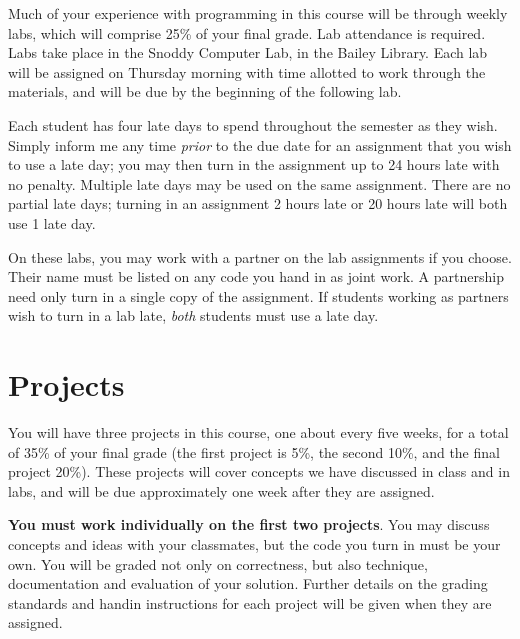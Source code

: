 \documentclass{article}
\begin{document}
Much of your experience with programming in this course will be
through weekly labs, which will comprise 25\% of your final grade. Lab
attendance is required. Labs take place in the Snoddy Computer Lab, in
the Bailey Library.  Each lab will be assigned on Thursday morning
with time allotted to work through the materials, and will be due by
the beginning of the following lab.

Each student has four late days to spend throughout the semester as
they wish.  Simply inform me any time \emph{prior} to the due date for an
assignment that you wish to use a late day; you may then turn in the
assignment up to 24 hours late with no penalty.  Multiple late days
may be used on the same assignment.  There are no partial late days;
turning in an assignment 2 hours late or 20 hours late will both use 1
late day.

On these labs, you may work with a partner on the lab assignments if
you choose. Their name must be listed on any code you hand in as joint
work.  A partnership need only turn in a single copy of the
assignment.  If students working as partners wish to turn in a lab
late, \emph{both} students must use a late day.

\section*{Projects}

You will have three projects in this course, one about every five
weeks, for a total of 35\% of your final grade (the first project is
5\%, the second 10\%, and the final project 20\%). These projects will
cover concepts we have discussed in class and in labs, and will be due
approximately one week after they are assigned.

\textbf{You must work individually on the first two projects}. You may
discuss concepts and ideas with your classmates, but the code you turn
in must be your own. You will be graded not only on correctness, but
also technique, documentation and evaluation of your solution. Further
details on the grading standards and handin instructions for each
project will be given when they are assigned.

\end{document}
